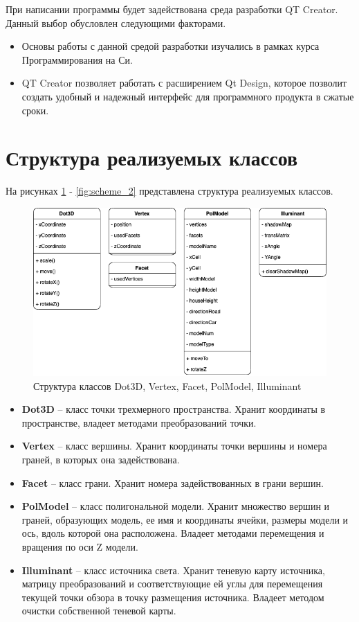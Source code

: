 \documentclass[a4paper,14pt, unknownkeysallowed]{extreport}
\begin{document}
При написании программы будет задействована среда разработки QT Creator. Данный выбор обусловлен следующими факторами.

\begin{itemize}
	\item Основы работы с данной средой разработки изучались в рамках курса Программирования на Си.
	\item QT Creator позволяет работать с расширением Qt Design, которое позволит создать удобный и надежный интерфейс для программного продукта в сжатые сроки.
\end{itemize}

\clearpage

\section{Структура реализуемых классов}

На рисунках \ref{fig:scheme_1} - \ref{fig:scheme_2} представлена структура реализуемых классов.

\begin{figure}[h]
	\centering
	\includegraphics[scale=0.6]{img/scheme_1.png}
	\caption{Структура классов Dot3D, Vertex, Facet, PolModel, Illuminant}
	\label{fig:scheme_1}
\end{figure} 

\begin{itemize}
	\item \textbf{Dot3D} -- класс точки трехмерного пространства. Хранит координаты в
	пространстве, владеет методами преобразований точки.
	\item \textbf{Vertex} -- класс вершины. Хранит координаты точки вершины и номера граней, в которых она задействована.
	\item \textbf{Facet} -- класс грани. Хранит номера задействованных в грани вершин.
	\item \textbf{PolModel} -- класс полигональной модели. Хранит множество вершин и граней, образующих модель, ее имя и координаты ячейки, размеры модели и ось, вдоль которой она расположена. Владеет методами перемещения и вращения по оси Z модели.
	\item \textbf{Illuminant} -- класс источника света. Хранит теневую карту источника, матрицу преобразований и соответствующие ей углы для перемещения текущей точки обзора в точку размещения источника. Владеет методом очистки собственной теневой карты.
\end{itemize}
\end{document}
